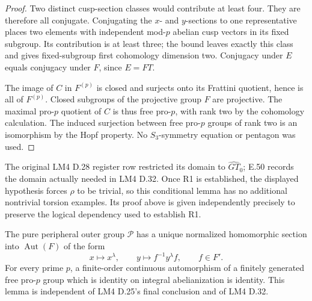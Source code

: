 \begin{proof}
Two distinct cusp-section classes would contribute
at least four. They are therefore all conjugate.
Conjugating the \(x\)- and \(y\)-sections to one
representative places two elements with independent
mod-\(p\) abelian cusp vectors in its fixed subgroup.
Its contribution is at least three; the bound leaves
exactly this class and gives fixed-subgroup first
cohomology dimension two. Conjugacy under \(E\)
equals conjugacy under \(F\), since \(E=FT\).

The image of \(C\) in \(F^{(p)}\) is closed and
surjects onto its Frattini quotient, hence is all
of \(F^{(p)}\). Closed subgroups of the projective
group \(F\) are projective. The maximal pro-\(p\)
quotient of \(C\) is thus free pro-\(p\), with
rank two by the cohomology calculation. The induced
surjection between free pro-\(p\) groups of rank
two is an isomorphism by the Hopf property.
No \(S_3\)-symmetry equation or pentagon was used.
\end{proof}

The original LM4 D.28 register row restricted its
domain to \(\widehat{GT}_0\); E.50 records the domain
actually needed in LM4 D.32. Once R1 is established,
the displayed hypothesis forces \(\rho\) to be
trivial, so this conditional lemma has no additional
nontrivial torsion examples. Its proof above is given
independently precisely to preserve the logical
dependency used to establish R1.

The pure peripheral outer group \(\mathcal P\)
has a unique normalized homomorphic section into
\(\operatorname{Aut}(F)\) of the form
\[
 x\longmapsto x^\lambda,
 \qquad y\longmapsto f^{-1}y^\lambda f,
 \qquad f\in F'.
\]
For every prime \(p\), a finite-order continuous
automorphism of a finitely generated free pro-\(p\)
group which is identity on integral abelianization
is identity. This lemma is independent of LM4
D.25's final conclusion and of LM4 D.32.

